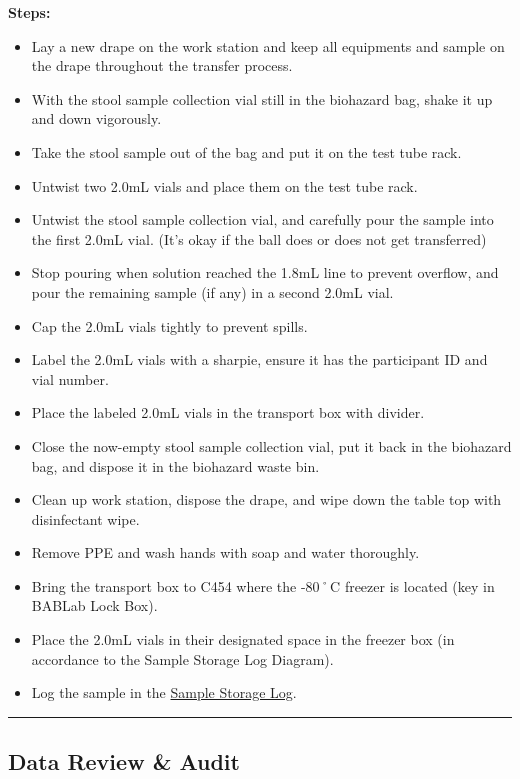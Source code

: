 \documentclass[]{book}
\providecommand{\tightlist}{%
  \setlength{\itemsep}{0pt}\setlength{\parskip}{0pt}}
\begin{document}
\textbf{Steps:}

\begin{itemize}
\tightlist
\item
  Lay a new drape on the work station and keep all equipments and sample on the drape throughout the transfer process.
\item
  With the stool sample collection vial still in the biohazard bag, shake it up and down vigorously.
\item
  Take the stool sample out of the bag and put it on the test tube rack.
\item
  Untwist two 2.0mL vials and place them on the test tube rack.
\item
  Untwist the stool sample collection vial, and carefully pour the sample into the first 2.0mL vial. (It's okay if the ball does or does not get transferred)
\item
  Stop pouring when solution reached the 1.8mL line to prevent overflow, and pour the remaining sample (if any) in a second 2.0mL vial.
\item
  Cap the 2.0mL vials tightly to prevent spills.
\item
  Label the 2.0mL vials with a sharpie, ensure it has the participant ID and vial number.
\item
  Place the labeled 2.0mL vials in the transport box with divider.
\item
  Close the now-empty stool sample collection vial, put it back in the biohazard bag, and dispose it in the biohazard waste bin.
\item
  Clean up work station, dispose the drape, and wipe down the table top with disinfectant wipe.
\item
  Remove PPE and wash hands with soap and water thoroughly.
\item
  Bring the transport box to C454 where the -80˚C freezer is located (key in BABLab Lock Box).
\item
  Place the 2.0mL vials in their designated space in the freezer box (in accordance to the Sample Storage Log Diagram).
\item
  Log the sample in the \href{https://app.box.com/file/630322897864}{Sample Storage Log}.
\end{itemize}

\begin{center}\rule{0.5\linewidth}{0.5pt}\end{center}

\hypertarget{data-review-audit}{%
\subsection{Data Review \& Audit}\label{data-review-audit}}
\end{document}
